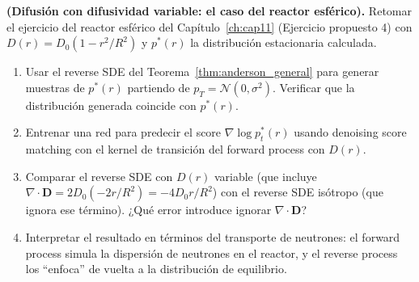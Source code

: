 \begin{ejercicio}
\textbf{(Difusión con difusividad variable: el caso del reactor esférico).}
Retomar el ejercicio del reactor esférico del Capítulo~\ref{ch:cap11} (Ejercicio propuesto 4)
con $D(r) = D_0(1-r^2/R^2)$ y $p^*(r)$ la distribución estacionaria calculada.
\begin{enumerate}[label=(\alph*)]
  \item Usar el reverse SDE del Teorema~\ref{thm:anderson_general} para generar
        muestras de $p^*(r)$ partiendo de $p_T = \mathcal{N}(0,\sigma^2)$.
        Verificar que la distribución generada coincide con $p^*(r)$.
  \item Entrenar una red para predecir el score $\nabla\log p_t^*(r)$ usando
        denoising score matching con el kernel de transición del forward process
        con $D(r)$.
  \item Comparar el reverse SDE con $D(r)$ variable (que incluye $\nabla\cdot\bm{D}
        = 2D_0(-2r/R^2) = -4D_0 r/R^2$) con el reverse SDE isótropo (que ignora
        ese término). ¿Qué error introduce ignorar $\nabla\cdot\bm{D}$?
  \item Interpretar el resultado en términos del transporte de neutrones: el
        forward process simula la dispersión de neutrones en el reactor, y el
        reverse process los ``enfoca'' de vuelta a la distribución de equilibrio.
\end{enumerate}
\end{ejercicio}

\printbibliography[heading=subbibliography]